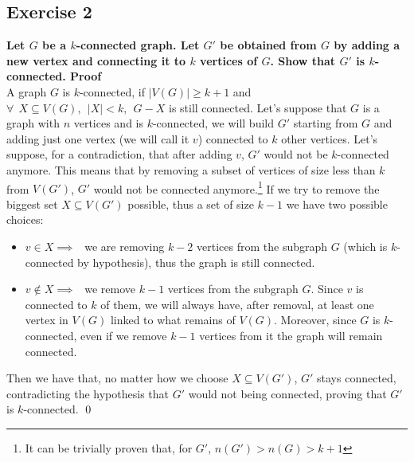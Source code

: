 \subsection*{Exercise 2}
\boldmath
\textbf{Let $G$ be a $k$-connected graph. Let $G'$ be obtained from $G$ by adding a new vertex and
connecting it to $k$ vertices of $G$. Show that $G'$ is $k$-connected.\spacer
Proof} \\
\unboldmath
A graph $G$ is $k$-connected, if $|V(G)| \geq k+1$ and $\forall \:\:X \subseteq V(G), \:\:|X| < k, \:\:G - X$ is still connected.\spacer
Let's suppose that $G$ is a graph with $n$ vertices and is $k$-connected, we will build $G'$ starting
from $G$ and adding just one vertex (we will call it $v$) connected to $k$ other vertices.\spacer
Let's suppose, for a contradiction, that after adding $v$, $G'$ would not be $k$-connected anymore. This means that by removing a subset of vertices of size less than $k$ from $V(G')$, $G'$ would not be connected anymore.\footnote{It can be trivially proven that, for $G'$, $n(G') > n(G) > k + 1$}\spacer
If we try to remove the biggest set $X \subseteq V(G')$ possible, thus a set of size $k - 1$ we have two possible choices:
\begin{itemize}
    \item $v \in X \implies \:\:$ we are removing $k - 2$ vertices from the subgraph $G$ (which is $k$-connected by hypothesis), thus the graph is still connected.
    \item $v \notin X \implies \:\:$ we remove $k - 1$ vertices from the subgraph $G$. Since $v$ is connected to $k$ of them, we will always have, after removal, at least one vertex in $V(G)$ linked to what remains of $V(G)$. Moreover, since $G$ is $k$-connected, even if we remove $k - 1$ vertices from it the graph will remain connected.
\end{itemize}
Then we have that, no matter how we choose $X \subseteq V(G')$, $G'$ stays connected,
contradicting the hypothesis that $G'$ would not being connected, proving that $G'$ is $k$-connected. \qed